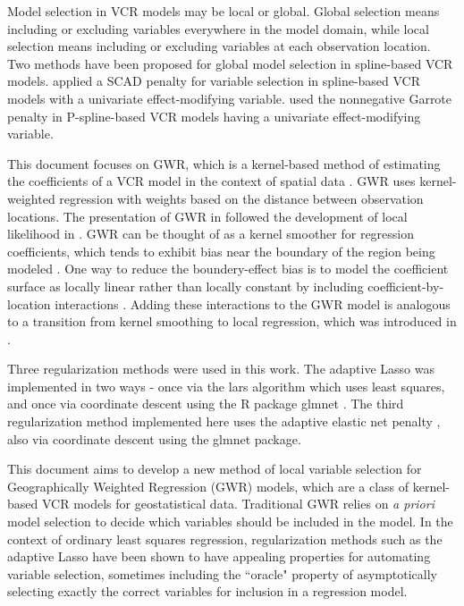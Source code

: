 \documentclass[authoryear, review, 11pt]{elsarticle}
\begin{document}
	Model selection in VCR models may be local or global. Global selection means including or excluding variables everywhere in the model domain, while local selection means including or excluding variables at each observation location. Two methods have been proposed for global model selection in spline-based VCR models. \cite{Wang:2008a} applied a SCAD penalty \citep{Fan:2001} for variable selection in spline-based VCR models with a univariate effect-modifying variable. \cite{Antoniadis:2012a} used the nonnegative Garrote penalty \citep{Breiman:1995} in P-spline-based VCR models having a univariate effect-modifying variable.

	This document focuses on GWR, which is a kernel-based method of estimating the coefficients of a VCR model in the context of spatial data \citep{Brundson:1998a, Fotheringham:2002}. GWR uses kernel-weighted regression with weights based on the distance between observation locations. The presentation of GWR in \cite{Fotheringham:2002} followed the development of local likelihood in \cite{Loader:1999}. GWR can be thought of as a kernel smoother for regression coefficients, which tends to exhibit bias near the boundary of the region being modeled \citep{Hastie:1993b}. One way to reduce the boundery-effect bias is to model the coefficient surface as locally linear rather than locally constant by including coefficient-by-location interactions \citep{Hastie:1993b}. Adding these interactions to the GWR model is analogous to a transition from kernel smoothing to local regression, which was introduced in \cite{Wang:2008b}.
	
	Three regularization methods were used in this work. The adaptive Lasso was implemented in two ways - once via the lars algorithm \citep{Efron:2004b} which uses least squares, and once via coordinate descent using the R package glmnet \citep{Friedman:2010}. The third regularization method implemented here uses the adaptive elastic net penalty \citep{Zou:2009}, also via coordinate descent using the glmnet package.
	
	This document aims to develop a new method of local variable selection for Geographically Weighted Regression (GWR) models, which are a class of kernel-based VCR models for geostatistical data. Traditional GWR relies on \emph{a priori} model selection to decide which variables should be included in the model. In the context of ordinary least squares regression, regularization methods such as the adaptive Lasso \citep{Zou:2006} have been shown to have appealing properties for automating variable selection, sometimes including the ``oracle" property of asymptotically selecting exactly the correct variables for inclusion in a regression model.
	
\end{document}
